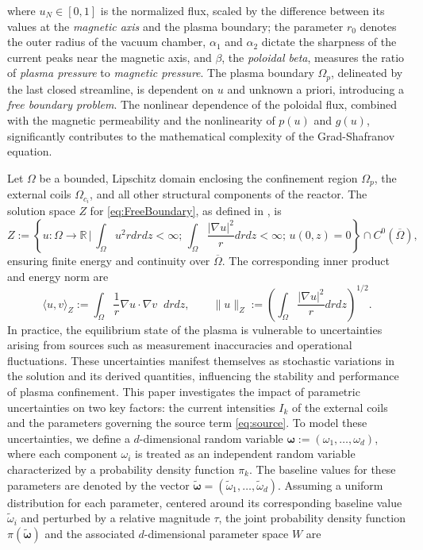 %
where $u_N \in [0,1]$ is the normalized flux, scaled by the difference between its values at the \textit{magnetic axis} and the plasma boundary; the parameter $r_0$ denotes the outer radius of the vacuum chamber, $\alpha_1$ and $\alpha_2$ dictate the sharpness of the current peaks near the magnetic axis, and $\beta$, the \textit{poloidal beta}, measures the ratio of \textit{plasma pressure} to \textit{magnetic pressure}. The plasma boundary $\Omega_p$, delineated by the last closed streamline,  is dependent on $u$ and unknown a priori, introducing a \textit{free boundary problem}. The nonlinear dependence of the poloidal flux, combined with the magnetic permeability and the nonlinearity of $p(u)$ and $g(u)$, significantly contributes to the mathematical complexity of the Grad-Shafranov equation.

Let $\Omega$ be a bounded, Lipschitz domain enclosing the confinement region $\Omega_p$, the external coils $\Omega_{c_i}$, and all other structural components of the reactor.
The solution space $Z$ for \eqref{eq:FreeBoundary}, as defined in \cite{Gr:1999}, is
%
\begin{equation}\label{eq:Soln_space}
    Z:=\left\{u:\Omega\rightarrow \mathbb{R} \,\Bigg| \,\int_\Omega u^2rdrdz<\infty; \,  \int_\Omega\frac{|\nabla u|^2}{r}drdz<\infty; \, u(0,z)=0 \right\}\cap C^0(\overline{\Omega}),
\end{equation}
%
ensuring finite energy and continuity over $\overline\Omega$. The corresponding inner product and energy norm are
%
\[
    \langle u,v\rangle_Z := \int_{\Omega} \frac{1}{r} \nabla u\cdot\nabla v \;\;drdz,\qquad \| u \|_{Z} :=\left(\int_\Omega\frac{|\nabla u|^2}{r} drdz\right)^{1/2}.
\]
%
In practice, the equilibrium state of the plasma is vulnerable to uncertainties arising from sources such as measurement inaccuracies and operational fluctuations. These uncertainties manifest themselves as stochastic variations in the solution and its derived quantities, influencing the stability and performance of plasma confinement. This paper investigates the impact of parametric uncertainties on two key factors: the current intensities $I_k$ of the external coils and the parameters governing the source term \eqref{eq:source}. To model these uncertainties, we define a $d$-dimensional random variable $\boldsymbol \omega :=(\omega_1,\ldots,\omega_d)$,  where each component $\omega_i$ is treated as an independent random variable characterized by a probability density function $\pi_k$. The baseline values for these parameters are denoted by the vector $\boldsymbol{\widetilde{\omega}} = (\widetilde{\omega}_1, \ldots, \widetilde{\omega}_d)$. Assuming a uniform distribution for each parameter, centered around its corresponding baseline value $\widetilde{\omega}_i$ and perturbed by a relative magnitude $\tau$, the joint probability density function $\pi(\boldsymbol{\widetilde{\omega}})$ and the associated $d$-dimensional parameter space $W$ are
